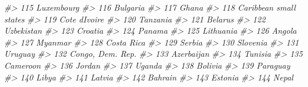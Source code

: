 \documentclass[
  xelatex, ja=standard]{bxjsbook}
\newenvironment{Shaded}{\begin{snugshade}}{\end{snugshade}}
\newcommand{\CommentTok}[1]{\textcolor[rgb]{0.56,0.35,0.01}{\textit{#1}}}
\theoremstyle{definition}
\theoremstyle{definition}
\theoremstyle{definition}
\theoremstyle{definition}
\theoremstyle{remark}
\begin{document}
\begin{Shaded}
\begin{Highlighting}[]
\CommentTok{\#\textgreater{} 115                                           Luxembourg}
\CommentTok{\#\textgreater{} 116                                             Bulgaria}
\CommentTok{\#\textgreater{} 117                                                Ghana}
\CommentTok{\#\textgreater{} 118                               Caribbean small states}
\CommentTok{\#\textgreater{} 119                                        Cote d\textquotesingle{}Ivoire}
\CommentTok{\#\textgreater{} 120                                             Tanzania}
\CommentTok{\#\textgreater{} 121                                              Belarus}
\CommentTok{\#\textgreater{} 122                                           Uzbekistan}
\CommentTok{\#\textgreater{} 123                                              Croatia}
\CommentTok{\#\textgreater{} 124                                               Panama}
\CommentTok{\#\textgreater{} 125                                            Lithuania}
\CommentTok{\#\textgreater{} 126                                               Angola}
\CommentTok{\#\textgreater{} 127                                              Myanmar}
\CommentTok{\#\textgreater{} 128                                           Costa Rica}
\CommentTok{\#\textgreater{} 129                                               Serbia}
\CommentTok{\#\textgreater{} 130                                             Slovenia}
\CommentTok{\#\textgreater{} 131                                              Uruguay}
\CommentTok{\#\textgreater{} 132                                     Congo, Dem. Rep.}
\CommentTok{\#\textgreater{} 133                                           Azerbaijan}
\CommentTok{\#\textgreater{} 134                                              Tunisia}
\CommentTok{\#\textgreater{} 135                                             Cameroon}
\CommentTok{\#\textgreater{} 136                                               Jordan}
\CommentTok{\#\textgreater{} 137                                               Uganda}
\CommentTok{\#\textgreater{} 138                                              Bolivia}
\CommentTok{\#\textgreater{} 139                                             Paraguay}
\CommentTok{\#\textgreater{} 140                                                Libya}
\CommentTok{\#\textgreater{} 141                                               Latvia}
\CommentTok{\#\textgreater{} 142                                              Bahrain}
\CommentTok{\#\textgreater{} 143                                              Estonia}
\CommentTok{\#\textgreater{} 144                                                Nepal}

\end{Highlighting}
\end{Shaded}
\end{document}
